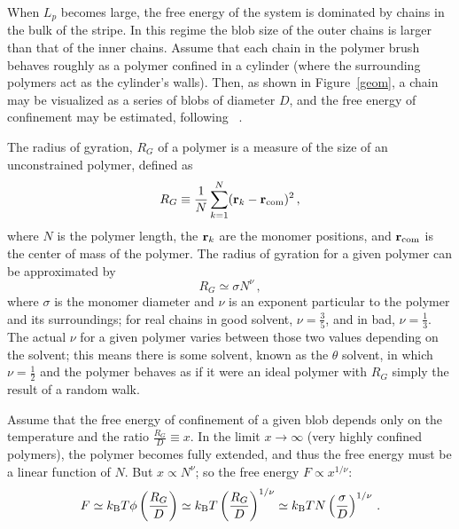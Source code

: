 When $L_p$ becomes large, 
the free energy of the system is dominated by chains 
in the bulk of the  stripe. In this regime the blob size of the outer chains is larger than that of the inner chains.
Assume that each chain in the polymer brush behaves roughly as a polymer confined in a cylinder (where the surrounding polymers act as the cylinder's walls).
Then, as shown in Figure~\ref{geom}, a chain may be visualized as a series of blobs of diameter $D$, and the free energy of confinement may be estimated, following \citeauthor{deGennes}~\cite{deGennes}.

The radius of gyration, $R_G$ of a polymer is a measure of the size of an unconstrained polymer, defined as
\begin{equation}
	R_G \equiv \frac{1}{N} \sum_{k = 1}^{N} ({\bf {r}}_k - {\bf {r}}_{\textrm {com}})^2 \,,
\end{equation}
where $N$ is the polymer length, the ${\bf {r}}_k$ are the monomer positions, and ${\bf {r}}_{\textrm {com}}$ is the center of mass of the polymer.
The radius of gyration for a given polymer can be approximated by
\begin{equation}
	R_G \simeq \sigma N^\nu \,,
\end{equation}
where $\sigma$ is the monomer diameter and $\nu$ is an exponent particular to the polymer and its surroundings; for real chains in good solvent, $\nu = \frac{3}{5}$, and in bad, $\nu = \frac{1}{3}$.
The actual $\nu$ for a given polymer varies between those two values depending on the solvent; this means there is some solvent, known as the $\theta$ solvent, in which $\nu = \frac{1}{2}$ and the polymer behaves as if it were an ideal polymer with $R_G$ simply the result of a random walk.

Assume that the free energy of confinement of a given blob depends only on the temperature and the ratio $\frac{R_G}{D} \equiv x$.
In the limit $x \rightarrow \infty$ (very highly confined polymers), the polymer becomes fully extended, and thus the free energy must be a linear function of $N$.
But $x \propto N^\nu$; so the free energy $F \propto x^{1/\nu}$:
\begin{equation}
	F \simeq k_{\textrm{B}} T \phi\left(\frac{R_G}{D}\right) \simeq k_{\textrm B} T \left(\frac{R_G}{D}\right)^{1/\nu} \simeq k_{\textrm B} T N \left(\frac{\sigma}{D}\right)^{1/\nu} \,.
	\label{F_conf}
\end{equation}

